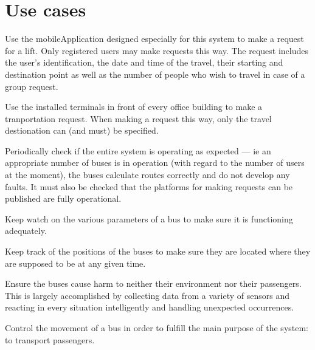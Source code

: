 \documentclass[a4paper]{article}
\begin{document}
\section{Use cases}

\begin{description}[style=nextline]
	\item[Make \gls{request} via \gls{mobileApplication}]
		Use the \gls{mobileApplication} designed especially for this
		system to make a \gls{request} for a lift. Only registered users
		may make \gls{request}s this way. The \gls{request} includes the
		user's identification, the date and time of the travel, their
		starting and destination point as well as the number of people
		who wish to travel in case of a group \gls{request}.

	\item[Make \gls{request} via \gls{terminal}]
		Use the installed \gls{terminal}s in front of every office
		building to make a tranportation \gls{request}. When making a
		\gls{request} this way, only the travel destionation can (and
		must) be specified.

	\item[Monitor system status]
		Periodically check if the entire system is operating as expected
		— ie an appropriate number of buses is in operation (with regard
		to the number of users at the moment), the buses calculate
		\gls{route}s correctly and do not develop any faults. It must
		also be checked that the platforms for making \gls{request}s can
		be published are fully operational.

	\item[Monitor bus condition]
		Keep watch on the various parameters of a bus to make sure it is
		functioning adequately.

	\item[Monitor bus position]
		Keep track of the positions of the buses to make sure they are
		located where they are supposed to be at any given time.

	\item[Avoid causing accidents]
		Ensure the buses cause harm to neither their environment nor
		their passengers. This is largely accomplished by collecting
		data from a variety of \gls{sensor}s and reacting in every
		situation intelligently and handling unexpected occurrences.

	\item[Drive bus]
		Control the movement of a bus in order to fulfill the main
		purpose of the system: to transport passengers.


\end{description}
\end{document}
